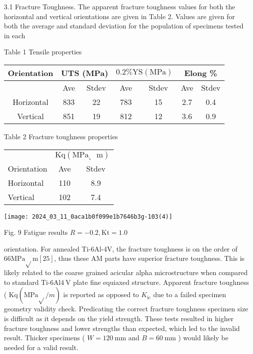 \documentclass[10pt]{article}
\begin{document}
3.1 Fracture Toughness. The apparent fracture toughness values for both the horizontal and vertical orientations are given in Table 2. Values are given for both the average and standard deviation for the population of specimens tested in each

Table 1 Tensile properties

\begin{center}
\begin{tabular}{|c|c|c|c|c|c|c|}
\hline
\multirow[b]{2}{*}{Orientation} & \multicolumn{2}{|c|}{UTS (MPa)} & \multicolumn{2}{|c|}{$0.2 \% \mathrm{YS}(\mathrm{MPa})$} & \multicolumn{2}{|c|}{Elong \%} \\
\hline
 & Ave & Stdev & Ave & Stdev & Ave & Stdev \\
\hline
Horizontal & 833 & 22 & 783 & 15 & 2.7 & 0.4 \\
\hline
Vertical & 851 & 19 & 812 & 12 & 3.6 & 0.9 \\
\hline
\end{tabular}
\end{center}

Table 2 Fracture toughness properties

\begin{center}
\begin{tabular}{lcc}
\hline\hline
 & \multicolumn{2}{c}{$\mathrm{Kq}\left(\mathrm{MPa}_{、} \mathrm{~m}\right)$} \\
\cline { 2 - 3 }
Orientation & Ave & Stdev \\
\hline
Horizontal & 110 & 8.9 \\
Vertical & 102 & 7.4 \\
\hline\hline
\end{tabular}
\end{center}

\begin{center}
\texttt{[image: 2024\_03\_11\_0aca1b0f099e1b7646b3g-103(4)]}
\end{center}

Fig. 9 Fatigue results $R=-0.2, \mathrm{Kt}=1.0$

orientation. For annealed Ti-6Al-4V, the fracture toughness is on the order of $66 \mathrm{MPa} \sqrt{ } \mathrm{m}[25]$, thus these AM parts have superior fracture toughness. This is likely related to the coarse grained acicular alpha microstructure when compared to standard Ti-6Al$4 \mathrm{~V}$ plate fine equiaxed structure. Apparent fracture toughness ( $\mathrm{Kq}(\mathrm{MPa} \sqrt{ } / m)$ is reported as opposed to $K_{\mathrm{ic}}$ due to a failed specimen geometry validity check. Predicating the correct fracture toughness specimen size is difficult as it depends on the yield strength. These tests resulted in higher fracture toughness and lower strengths than expected, which led to the invalid result. Thicker specimens ( $W=120 \mathrm{~mm}$ and $B=60 \mathrm{~mm}$ ) would likely be needed for a valid result.
\end{document}
